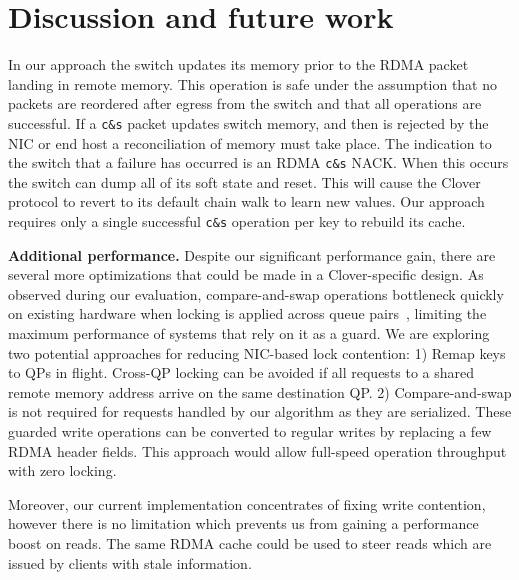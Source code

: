\section{Discussion and future work}
\label{sec:future}

\textbf{}
In our approach the switch updates its memory prior to the RDMA packet
landing in remote memory. This operation is safe under the assumption
that no packets are reordered after egress from the switch and that
all operations are successful. If a \texttt{c\&s} packet updates
switch memory, and then is rejected by the NIC or end host a
reconciliation of memory must take place. The indication to the switch
that a failure has occurred is an RDMA \texttt{c\&s} NACK. When this
occurs the switch can dump all of its soft state and reset. This will
cause the Clover protocol to revert to its default chain walk to
learn new values. Our approach requires only a single successful
\texttt{c\&s} operation per key to rebuild its cache.

\textbf{Additional performance.}
Despite our significant performance gain, there are several more optimizations that could be made in a Clover-specific design.
As observed during our evaluation,
compare-and-swap operations bottleneck quickly on existing hardware
when locking is applied across queue pairs~\cite{design-guidelines},
limiting the maximum performance of systems that rely on it as a
guard.  We are exploring two potential approaches for reducing
NIC-based lock contention: 1) Remap keys to QPs in flight. Cross-QP
locking can be avoided if all requests to a shared remote memory
address arrive on the same destination QP. 2) Compare-and-swap is not
required for requests handled by our algorithm as they are serialized.
These guarded write operations can be converted to regular writes by
replacing a few RDMA header fields. This approach would allow
full-speed operation throughput with zero locking.

Moreover, our current implementation concentrates of fixing write contention,
however there is no limitation which prevents us from gaining a performance
boost on reads. The same RDMA cache could be used to steer
reads which are issued by clients with stale information.




